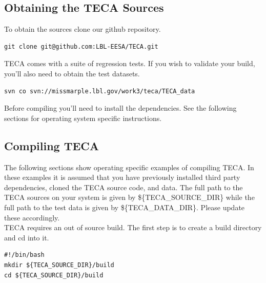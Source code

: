 \documentclass[a4paper,10pt,DIV=12]{scrreprt}
\begin{document}
\subsection{Obtaining the TECA Sources}
To obtain the sources clone our github repository.

\vspace{2mm}\hspace{0.2in}\begin{minipage}{0.8\textwidth}
\begin{verbatim}
git clone git@github.com:LBL-EESA/TECA.git
\end{verbatim}
\end{minipage}\vspace{2mm}

\noindent TECA comes with a suite of regression tests. If you wish to validate your build, you'll also need to obtain the test datasets.

\vspace{2mm}\hspace{0.2in}\begin{minipage}{0.8\textwidth}
\begin{verbatim}
svn co svn://missmarple.lbl.gov/work3/teca/TECA_data
\end{verbatim}
\end{minipage}\vspace{2mm}

\noindent Before compiling you'll need to install the dependencies. See the following sections
for operating system specific instructions.

\subsection{Compiling TECA}
The following sections show operating specific examples of compiling TECA. In these examples
it is assumed that you have previously installed third party dependencies, cloned the TECA source
code, and data. The full path to the TECA sources on your system is
given by \$\{TECA\_SOURCE\_DIR\} while the full path to the test data is given by
\$\{TECA\_DATA\_DIR\}. Please update these accordingly.\\


\noindent TECA requires an out of source build. The first step is to create a build directory and
cd into it.
\vspace{2mm}\hspace{0.2in}\begin{minipage}{0.8\textwidth}
\begin{verbatim}
#!/bin/bash
mkdir ${TECA_SOURCE_DIR}/build
cd ${TECA_SOURCE_DIR}/build
\end{verbatim}
\end{minipage}\vspace{2mm}
\end{document}
